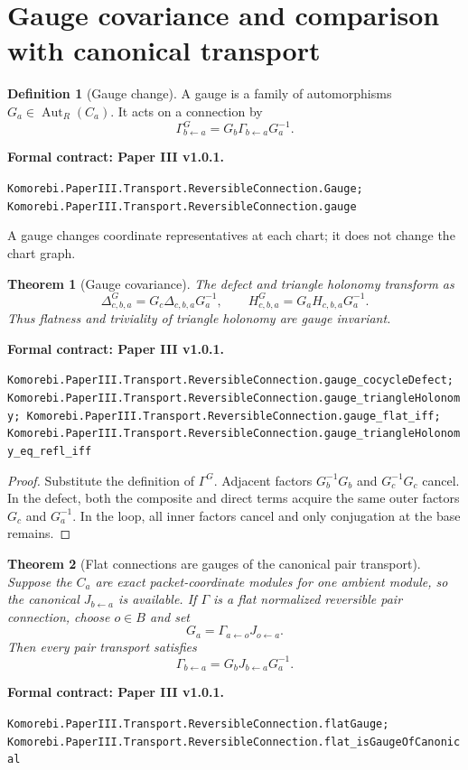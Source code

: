 \documentclass[11pt,a4paper]{article}
\newtheorem{theorem}{Theorem}[section]
\theoremstyle{plain}
\theoremstyle{definition}
\newtheorem{definition}[definition]{Definition}
\theoremstyle{remark}
\newcommand{\leanname}[1]{\nolinkurl{#1}}
\newcommand{\statusleanthree}[1]{\par\smallskip\noindent\begin{minipage}{\linewidth}{\color{leanblue}\textbf{Formal contract: Paper III v1.0.1.}}\par\begingroup\small\raggedright\leanname{#1}\par\endgroup\end{minipage}\par\smallskip}
\begin{document}
\section{Gauge covariance and comparison with canonical transport}
\label{sec:gauge}

\begin{definition}[Gauge change]
\label{def:gauge-change}
A gauge is a family of automorphisms $G_a\in\operatorname{Aut}_R(C_a)$.
It acts on a connection by
\[
\Gamma^G_{b\leftarrow a}
=
G_b\Gamma_{b\leftarrow a}G_a^{-1}.
\]
\end{definition}
\statusleanthree{Komorebi.PaperIII.Transport.ReversibleConnection.Gauge; Komorebi.PaperIII.Transport.ReversibleConnection.gauge}

A gauge changes coordinate representatives at each chart; it does not change
the chart graph.

\begin{theorem}[Gauge covariance]
\label{thm:gauge-covariance}
The defect and triangle holonomy transform as
\[
\Delta^G_{c,b,a}
=G_c\Delta_{c,b,a}G_a^{-1},
\qquad
H^G_{c,b,a}
=G_aH_{c,b,a}G_a^{-1}.
\]
Thus flatness and triviality of triangle holonomy are gauge invariant.
\end{theorem}
\statusleanthree{Komorebi.PaperIII.Transport.ReversibleConnection.gauge_cocycleDefect; Komorebi.PaperIII.Transport.ReversibleConnection.gauge_triangleHolonomy; Komorebi.PaperIII.Transport.ReversibleConnection.gauge_flat_iff; Komorebi.PaperIII.Transport.ReversibleConnection.gauge_triangleHolonomy_eq_refl_iff}

\begin{proof}
Substitute the definition of $\Gamma^G$.  Adjacent factors
$G_b^{-1}G_b$ and $G_c^{-1}G_c$ cancel.  In the defect, both the composite
and direct terms acquire the same outer factors $G_c$ and $G_a^{-1}$.  In
the loop, all inner factors cancel and only conjugation at the base remains.
\end{proof}

\begin{theorem}[Flat connections are gauges of the canonical pair transport]
\label{thm:flat-gauge-canonical}
Suppose the $C_a$ are exact packet-coordinate modules for one ambient module,
so the canonical $J_{b\leftarrow a}$ is available.  If $\Gamma$ is a flat
normalized reversible pair connection, choose $o\in B$ and set
\[
G_a=\Gamma_{a\leftarrow o}J_{o\leftarrow a}.
\]
Then every pair transport satisfies
\[
\boxed{
\Gamma_{b\leftarrow a}
=G_bJ_{b\leftarrow a}G_a^{-1}.
}
\]
\end{theorem}
\statusleanthree{Komorebi.PaperIII.Transport.ReversibleConnection.flatGauge; Komorebi.PaperIII.Transport.ReversibleConnection.flat_isGaugeOfCanonical}
\end{document}
